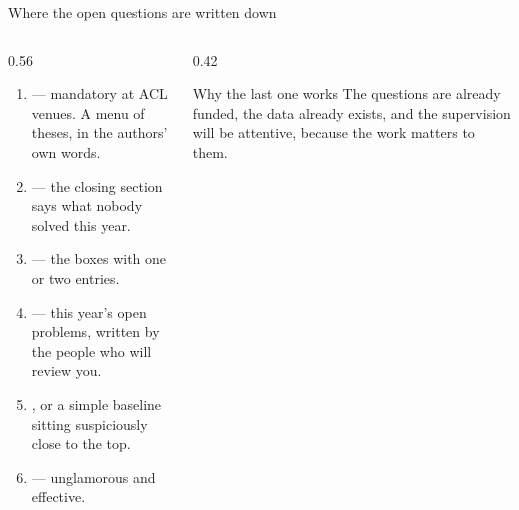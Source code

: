 \documentclass[aspectratio=169,11pt]{beamer}
\begin{document}
\begin{frame}{Where the open questions are written down}
\begin{columns}[T]
\begin{column}{0.56\textwidth}
\footnotesize
\begin{enumerate}
  \item {} --- mandatory at ACL venues. A menu of
        theses, in the authors' own words.
  \item {} --- the closing section says what nobody
        solved this year.
  \item {} --- the boxes with one or two entries.
  \item {} --- this year's open problems, written
        by the people who will review you.
  \item {}, or a simple baseline sitting
        suspiciously close to the top.
  \item {} --- unglamorous and effective.
\end{enumerate}
\end{column}
\begin{column}{0.42\textwidth}
\begin{block}{Why the last one works}
\footnotesize
The questions are already funded, the data already exists, and the supervision
will be attentive, because the work matters to them.
\end{block}
\end{column}
\end{columns}
\end{frame}
\end{document}
